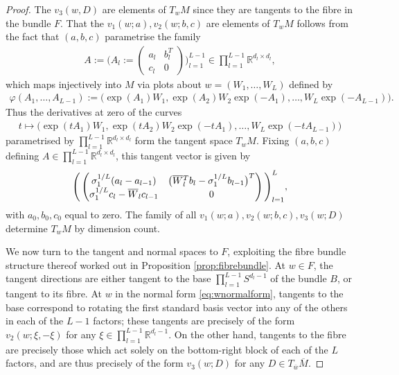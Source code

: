 \documentclass{article}
\newcommand{\RB}{\mathbb{R}}
\newcommand{\bw}{\overline{w}}
\newcommand{\bW}{\smash{\overline{W}}\vphantom{W}}
\newcommand{\bM}{\overline{M}}
\theoremstyle{plain}
\theoremstyle{definition}
\theoremstyle{remark}
\begin{document}
\begin{proof}
    The $v_3(w,D)$ are elements of $T_wM$ since they are tangents to the fibre in the bundle $F$. That the $v_1(w;a),v_2(w;b,c)$ are elements of $T_wM$ follows from the fact that $(a,b,c)$ parametrise the family
    \begin{align}
    A:=\Bigg(A_l:=\begin{pmatrix} a_l & b_l^T \\ c_l & 0\end{pmatrix}\Bigg)_{l=1}^{L-1}\in\prod_{l=1}^{L-1}\RB^{d_l\times d_l},
    \end{align}
    which maps injectively into $M$ via plots about $w = (W_1,\dots,W_L)$ defined by
    \begin{align}
    \varphi(A_1,\dots,A_{L-1}):=\big(\exp(A_1)W_1,\exp(A_2)W_2\exp(-A_1),\dots,W_L\exp(-A_{L-1})\big).
    \end{align}
    Thus the derivatives at zero of the curves
    \begin{align}
    t\mapsto \big(\exp(tA_1)W_1,\exp(tA_2)W_2\exp(-tA_1),\dots,W_L\exp(-tA_{L-1})\big)
    \end{align}
    parametrised by $\prod_{l=1}^{L-1}\RB^{d_l\times d_l}$ form the tangent space $T_wM$. Fixing $(a,b,c)$ defining $A\in\prod_{l=1}^{L-1}\RB^{d_l\times d_l}$, this tangent vector is given by
    \begin{align}
    \Bigg(\begin{pmatrix} \sigma_1^{1/L}(a_l-a_{l-1}) & \big(\bW_l^Tb_l-\sigma_1^{1/L}b_{l-1}\big)^T \\ \sigma_1^{1/L}c_l-\bW_lc_{l-1} & 0\end{pmatrix}\Bigg)_{l=1}^{L},
    \end{align}
    with $a_0,b_0,c_0$ equal to zero. The family of all $v_1(w;a), v_2(w;b,c),v_3(w;D)$ determine $T_wM$ by dimension count.

    We now turn to the tangent and normal spaces to $F$, exploiting the fibre bundle structure thereof worked out in Proposition \ref{prop:fibrebundle}. At $w\in F$, the tangent directions are either tangent to the base $\prod_{l=1}^{L-1}S^{d_l-1}$ of the bundle $B$, or tangent to its fibre. At $w$ in the normal form \eqref{eq:wnormalform}, tangents to the base correspond to rotating the first standard basis vector into any of the others in each of the $L-1$ factors; these tangents are precisely of the form $v_2(w;\xi,-\xi)$ for any $\xi\in\prod_{l=1}^{L-1}\RB^{d_l-1}$. On the other hand, tangents to the fibre are precisely those which act solely on the bottom-right block of each of the $L$ factors, and are thus precisely of the form $v_3(w;D)$ for any $D\in T_{\bw}\bM$.


\end{proof}
\end{document}
